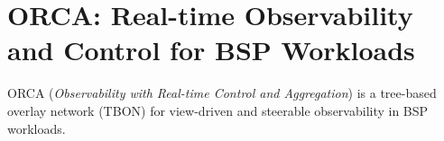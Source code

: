 \section{ORCA: Real-time Observability and Control for BSP Workloads}
\label{sec:intro:orca}

ORCA (\emph{Observability with Real-time Control and Aggregation}) is a tree-based overlay network
(TBON) for view-driven and steerable observability in BSP workloads.

